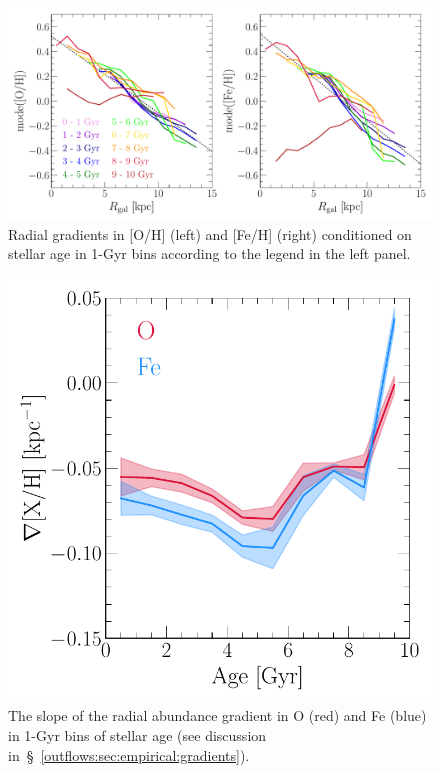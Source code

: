 \begin{figure}
\centering
\includegraphics[scale = 0.55]{gradxh_fixedage.pdf}
\caption{
Radial gradients in [O/H] (left) and [Fe/H] (right) conditioned on stellar age
in 1-Gyr bins according to the legend in the left panel.
}
\label{outflows:fig:gradxh-fixed-age}
\end{figure}



\begin{figure}
\centering
\includegraphics[scale = 0.6]{gradxh_vs_age.pdf}
\caption{
The slope of the radial abundance gradient in O (red) and Fe (blue) in 1-Gyr
bins of stellar age (see discussion
in~\S~\ref{outflows:sec:empirical:gradients}).
}
\label{outflows:fig:gradxh-vs-age}
\end{figure}

